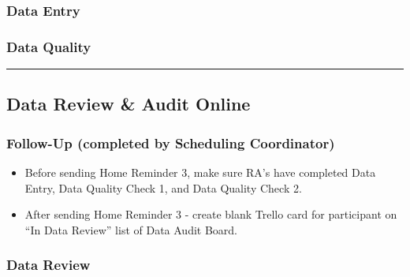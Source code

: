 \documentclass[]{book}
\providecommand{\tightlist}{%
  \setlength{\itemsep}{0pt}\setlength{\parskip}{0pt}}
\begin{document}
\hypertarget{data-entry}{%
\subsubsection{Data Entry}\label{data-entry}}

\hypertarget{data-quality}{%
\subsubsection{Data Quality}\label{data-quality}}

\begin{center}\rule{0.5\linewidth}{0.5pt}\end{center}

\hypertarget{data-review-audit-online}{%
\subsection{Data Review \& Audit Online}\label{data-review-audit-online}}

\hypertarget{follow-up-completed-by-scheduling-coordinator}{%
\subsubsection{Follow-Up (completed by Scheduling Coordinator)}\label{follow-up-completed-by-scheduling-coordinator}}

\begin{itemize}
\tightlist
\item
  Before sending Home Reminder 3, make sure RA's have completed Data Entry, Data Quality Check 1, and Data Quality Check 2.
\item
  After sending Home Reminder 3 - create blank Trello card for participant on ``In Data Review'' list of Data Audit Board.
\end{itemize}

\hypertarget{data-review}{%
\subsubsection{Data Review}\label{data-review}}
\end{document}
